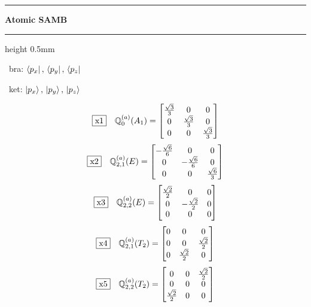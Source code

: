 \documentclass[fleqn,10pt,landscape]{jsarticle}
\begin{document}
\vspace{5mm}
\noindent \rule[0.5mm]{5mm}{0.5mm}\hspace{3mm}\textbf{Atomic SAMB}\hspace{3mm}\leaders\hrule height 0.5mm\hfill\kern0pt
\vspace{3mm}

\vspace{5mm}

\noindent\textbullet\, bra: $\bra{p_{x}},\, \bra{p_{y}},\, \bra{p_{z}}$

\noindent\textbullet\, ket: $\ket{p_{x}},\, \ket{p_{y}},\, \ket{p_{z}}$

\begin{dmath*}
\fbox{x1}\quad \mathbb{Q}_{0}^{(a)}(A_{1})=\begin{bmatrix} \frac{\sqrt{3}}{3} & 0 & 0 \\ 0 & \frac{\sqrt{3}}{3} & 0 \\ 0 & 0 & \frac{\sqrt{3}}{3} \end{bmatrix}
\end{dmath*}
\begin{dmath*}
\fbox{x2}\quad \mathbb{Q}_{2,1}^{(a)}(E)=\begin{bmatrix} - \frac{\sqrt{6}}{6} & 0 & 0 \\ 0 & - \frac{\sqrt{6}}{6} & 0 \\ 0 & 0 & \frac{\sqrt{6}}{3} \end{bmatrix}
\end{dmath*}
\begin{dmath*}
\fbox{x3}\quad \mathbb{Q}_{2,2}^{(a)}(E)=\begin{bmatrix} \frac{\sqrt{2}}{2} & 0 & 0 \\ 0 & - \frac{\sqrt{2}}{2} & 0 \\ 0 & 0 & 0 \end{bmatrix}
\end{dmath*}
\begin{dmath*}
\fbox{x4}\quad \mathbb{Q}_{2,1}^{(a)}(T_{2})=\begin{bmatrix} 0 & 0 & 0 \\ 0 & 0 & \frac{\sqrt{2}}{2} \\ 0 & \frac{\sqrt{2}}{2} & 0 \end{bmatrix}
\end{dmath*}
\begin{dmath*}
\fbox{x5}\quad \mathbb{Q}_{2,2}^{(a)}(T_{2})=\begin{bmatrix} 0 & 0 & \frac{\sqrt{2}}{2} \\ 0 & 0 & 0 \\ \frac{\sqrt{2}}{2} & 0 & 0 \end{bmatrix}
\end{dmath*}
\end{document}
